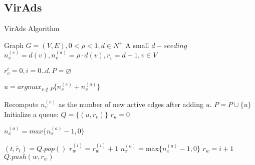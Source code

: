 \subsection{VirAds} 


\begin{algorithm}
	\caption{VirAds Algorithm}
	\begin{algorithmic}[1]
		
		
		\Require Graph $G = (V,E),0<\rho<1,d\in N^{+}$
		\Ensure A small $d-seeding$ 
		\State $n_{v}^{(e)} = d(v),n_{v}^{(a)} = \rho \cdot d(v), r_{v}  = d + 1, v \in V $
		
		\State $r_{v}^{i}=0, i=0..d, P  = \varnothing $
		
		
		\Repeat
		\State $u  = argmax_{v\not\in P}\{n_{v}^{(e)}+n_{v}^{(a)}\}$ 
		
		Recompute $n_{v}^{(e)}$ as the number of new active edges after adding $u$.
		\State $P  = P \cup \{u\} $
		\State Initialize a queue: $Q  = \{(u,r_{v})\} $
		\State $r_u = 0 $
		
		\State $n_{x}^{(a)}  = max\{n_{x}^{(a)}-1,0\} $
		
		\EndFor
		\State$(t,\widetilde{r_{t}})  = Q.pop() $
		\State $r_{w}^{(i)}=r_{w}^{(i)}+1 $
		\State $n_{x}^{(a)} =$max$\{n_{x}^{(a)}-1,0\} $	
		\EndFor
		\State $r_{w}=i+1 $
		\State $Q.push(w,r_{w}) $	
		\EndIf
		\EndIf
		\EndFor
		\EndFor
		\EndWhile
		\EndWhile
	\end{algorithmic}
\end{algorithm}
